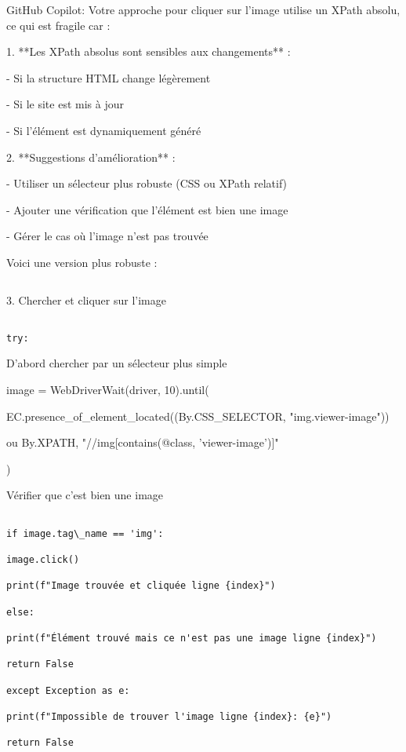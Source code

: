 GitHub Copilot: Votre approche pour cliquer sur l'image utilise un XPath absolu, ce qui est fragile car :

1. **Les XPath absolus sont sensibles aux changements** :

- Si la structure HTML change légèrement

- Si le site est mis à jour

- Si l'élément est dynamiquement généré

2. **Suggestions d'amélioration** :

- Utiliser un sélecteur plus robuste (CSS ou XPath relatif)

- Ajouter une vérification que l'élément est bien une image

- Gérer le cas où l'image n'est pas trouvée

Voici une version plus robuste :

\begin{verbatim}

\end{verbatim}

  3. Chercher et cliquer sur l'image

\begin{verbatim}

try:

\end{verbatim}

  D'abord chercher par un sélecteur plus simple

image = WebDriverWait(driver, 10).until(

EC.presence\_of\_element\_located((By.CSS\_SELECTOR, "img.viewer-image"))

  ou By.XPATH, "//img[contains(@class, 'viewer-image')]"

)

  Vérifier que c'est bien une image

\begin{verbatim}

if image.tag\_name == 'img':

image.click()

print(f"Image trouvée et cliquée ligne {index}")

else:

print(f"Élément trouvé mais ce n'est pas une image ligne {index}")

return False

except Exception as e:

print(f"Impossible de trouver l'image ligne {index}: {e}")

return False

\end{verbatim}

